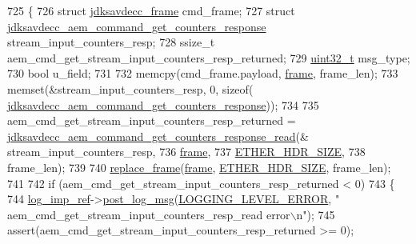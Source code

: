 \begin{DoxyCode}
725 \{
726     \textcolor{keyword}{struct }\hyperlink{structjdksavdecc__frame}{jdksavdecc\_frame} cmd\_frame;
727     \textcolor{keyword}{struct }\hyperlink{structjdksavdecc__aem__command__get__counters__response}{jdksavdecc\_aem\_command\_get\_counters\_response} 
      stream\_input\_counters\_resp;
728     ssize\_t aem\_cmd\_get\_stream\_input\_counters\_resp\_returned;
729     \hyperlink{parse_8c_a6eb1e68cc391dd753bc8ce896dbb8315}{uint32\_t} msg\_type;
730     \textcolor{keywordtype}{bool} u\_field;
731 
732     memcpy(cmd\_frame.payload, \hyperlink{gst__avb__playbin_8c_ac8e710e0b5e994c0545d75d69868c6f0}{frame}, frame\_len);
733     memset(&stream\_input\_counters\_resp, 0, \textcolor{keyword}{sizeof}(
      \hyperlink{structjdksavdecc__aem__command__get__counters__response}{jdksavdecc\_aem\_command\_get\_counters\_response}));
734 
735     aem\_cmd\_get\_stream\_input\_counters\_resp\_returned = 
      \hyperlink{group__command__get__counters__response_gacf145828e1039af292f7cdb5b8231d65}{jdksavdecc\_aem\_command\_get\_counters\_response\_read}(&
      stream\_input\_counters\_resp,
736                                                                                                         
      \hyperlink{gst__avb__playbin_8c_ac8e710e0b5e994c0545d75d69868c6f0}{frame},
737                                                                                                         
      \hyperlink{namespaceavdecc__lib_a6c827b1a0d973e18119c5e3da518e65ca9512ad9b34302ba7048d88197e0a2dc0}{ETHER\_HDR\_SIZE},
738                                                                                                         
      frame\_len);
739 
740     \hyperlink{classavdecc__lib_1_1descriptor__base__imp_a482fe95208e9e14885e28e73e7be2c49}{replace\_frame}(\hyperlink{gst__avb__playbin_8c_ac8e710e0b5e994c0545d75d69868c6f0}{frame}, \hyperlink{namespaceavdecc__lib_a6c827b1a0d973e18119c5e3da518e65ca9512ad9b34302ba7048d88197e0a2dc0}{ETHER\_HDR\_SIZE}, frame\_len);
741 
742     \textcolor{keywordflow}{if} (aem\_cmd\_get\_stream\_input\_counters\_resp\_returned < 0)
743     \{
744         \hyperlink{namespaceavdecc__lib_acbe3e2a96ae6524943ca532c87a28529}{log\_imp\_ref}->\hyperlink{classavdecc__lib_1_1log_a68139a6297697e4ccebf36ccfd02e44a}{post\_log\_msg}(\hyperlink{namespaceavdecc__lib_a501055c431e6872ef46f252ad13f85cdaf2c4481208273451a6f5c7bb9770ec8a}{LOGGING\_LEVEL\_ERROR}, \textcolor{stringliteral}{"
      aem\_cmd\_get\_stream\_input\_counters\_resp\_read error\(\backslash\)n"});
745         assert(aem\_cmd\_get\_stream\_input\_counters\_resp\_returned >= 0);

\end{DoxyCode}
